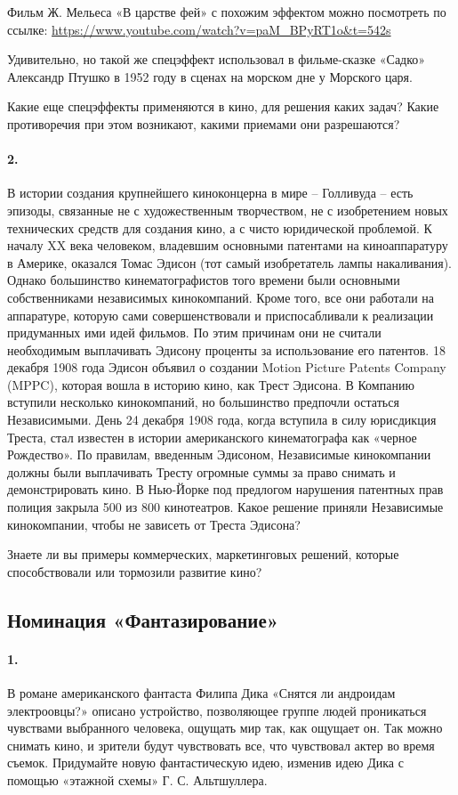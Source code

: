 \documentclass[11pt,a4paper]{article}
\begin{document}
Фильм Ж. Мельеса «В царстве фей» с похожим эффектом можно посмотреть по
ссылке: \url{https://www.youtube.com/watch?v=paM_BPyRT1o&t=542s}

Удивительно, но такой же спецэффект использовал в фильме-сказке «Садко»
Александр Птушко в 1952 году в сценах на морском дне у Морского царя.

Какие еще спецэффекты применяются в кино, для решения каких задач? Какие
противоречия при этом возникают, какими приемами они разрешаются?

\paragraph{2.}
В истории создания крупнейшего киноконцерна в мире – Голливуда – есть эпизоды,
связанные не с художественным творчеством, не с изобретением новых технических
средств для создания кино, а с чисто юридической проблемой. К началу XX века
человеком, владевшим основными патентами на киноаппаратуру в Америке, оказался
Томас Эдисон (тот самый изобретатель лампы накаливания). Однако большинство
кинематографистов того времени были основными собственниками независимых
кинокомпаний. Кроме того, все они работали на аппаратуре, которую сами
совершенствовали и приспосабливали к реализации придуманных ими идей
фильмов. По этим причинам они не считали необходимым выплачивать Эдисону
проценты за использование его патентов. 18 декабря 1908 года Эдисон объявил о
создании Motion Picture Patents Company (MPPC), которая вошла в историю кино,
как Трест Эдисона. В Компанию вступили несколько кинокомпаний, но большинство
предпочли остаться Независимыми. День 24 декабря 1908 года, когда вступила в
силу юрисдикция Треста, стал известен в истории американского кинематографа
как «черное Рождество». По правилам, введенным Эдисоном, Независимые
кинокомпании должны были выплачивать Тресту огромные суммы за право снимать и
демонстрировать кино. В Нью-Йорке под предлогом нарушения патентных прав
полиция закрыла 500 из 800 кинотеатров. Какое решение приняли Независимые
кинокомпании, чтобы не зависеть от Треста Эдисона?

Знаете ли вы примеры коммерческих, маркетинговых решений, которые
способствовали или тормозили развитие кино?

\subsection*{Номинация «Фантазирование»}

\paragraph{1.}
В романе американского фантаста Филипа Дика «Снятся ли андроидам электроовцы?»
описано устройство, позволяющее группе людей проникаться чувствами выбранного
человека, ощущать мир так, как ощущает он. Так можно снимать кино, и зрители
будут чувствовать все, что чувствовал актер во время съемок. Придумайте новую
фантастическую идею, изменив идею Дика с помощью «этажной схемы»
Г. С. Альтшуллера.
\end{document}
